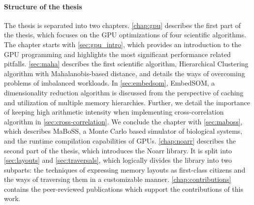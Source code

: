 \paragraph{Structure of the thesis}

The thesis is separated into two chapters. \cref{chap:gpu} describes the first part of the thesis, which focuses on the GPU optimizations of four scientific algorithms. The chapter starts with \cref{sec:gpu_intro}, which provides an introduction to the GPU programming and highlights the most significant performance related pitfalls. \cref{sec:maha} describes the first scientific algorithm, Hierarchical Clustering algorithm with Mahalanobis-based distance, and details the ways of overcoming problems of imbalanced workloads. In \cref{sec:embedsom}, EmbedSOM, a dimensionality reduction algorithm is discussed from the perspective of caching and utilization of multiple memory hierarchies. Further, we detail the importance of keeping high arithmetic intensity when implementing cross-correlation algorithm in \cref{sec:cross-correlation}. We conclude the chapter with \cref{sec:maboss}, which describes MaBoSS, a Monte Carlo based simulator of biological systems, and the runtime compilation capabilities of GPUs. \cref{chap:noarr} describes the second part of the thesis, which introduces the Noarr library. It is split into \cref{sec:layouts} and \cref{sec:traversals}, which logically divides the library into two subparts: the techniques of expressing memory layouts as first-class citizens and the ways of traversing them in a customizable manner. \cref{chap:contributions} contains the peer-reviewed publications which support the contributions of this work.
